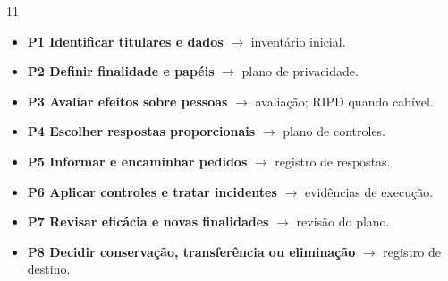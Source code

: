 \documentclass[a1,portrait]{a0poster}
\begin{document}
\begin{textblock}{11}
{\small
\begin{itemize}
    \item \textbf{P1 Identificar titulares e dados} $\rightarrow$ inventário inicial.
    \item \textbf{P2 Definir finalidade e papéis} $\rightarrow$ plano de privacidade.
    \item \textbf{P3 Avaliar efeitos sobre pessoas} $\rightarrow$ avaliação; RIPD quando cabível.
    \item \textbf{P4 Escolher respostas proporcionais} $\rightarrow$ plano de controles.
    \item \textbf{P5 Informar e encaminhar pedidos} $\rightarrow$ registro de respostas.
    \item \textbf{P6 Aplicar controles e tratar incidentes} $\rightarrow$ evidências de execução.
    \item \textbf{P7 Revisar eficácia e novas finalidades} $\rightarrow$ revisão do plano.
    \item \textbf{P8 Decidir conservação, transferência ou eliminação} $\rightarrow$ registro de destino.
\end{itemize}
}

\end{textblock}
\end{document}
